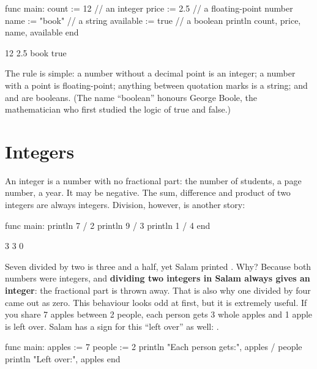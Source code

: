 \begin{salamcode}
func main:
    count := 12          // an integer
    price := 2.5         // a floating-point number
    name := "book"       // a string
    available := true    // a boolean
    println count, price, name, available
end
\end{salamcode}

\begin{salamout}
12 2.5 book true
\end{salamout}

The rule is simple: a number without a decimal point is an integer; a number
with a point is floating-point; anything between quotation marks is a
string; and  and  are booleans. (The name
``boolean'' honours George Boole, the mathematician who first studied the
logic of true and false.)

\section{Integers}

An integer is a number with no fractional part: the number of students, a
page number, a year. It may be negative. The sum, difference and product of
two integers are always integers. Division, however, is another story:

\begin{salamcode}
func main:
    println 7 / 2
    println 9 / 3
    println 1 / 4
end
\end{salamcode}

\begin{salamout}
3
3
0
\end{salamout}

Seven divided by two is three and a half, yet Salam printed . Why?
Because both numbers were integers, and \textbf{dividing two integers in
Salam always gives an integer}: the fractional part is thrown away. That is
also why one divided by four came out as zero. This behaviour looks odd at
first, but it is extremely useful. If you share 7 apples between 2 people,
each person gets 3 whole apples and 1 apple is left over. Salam has a sign
for this ``left over'' as well: \code{\%}.

\begin{salamcode}
func main:
    apples := 7
    people := 2
    println "Each person gets:", apples / people
    println "Left over:", apples %
end
\end{salamcode}

